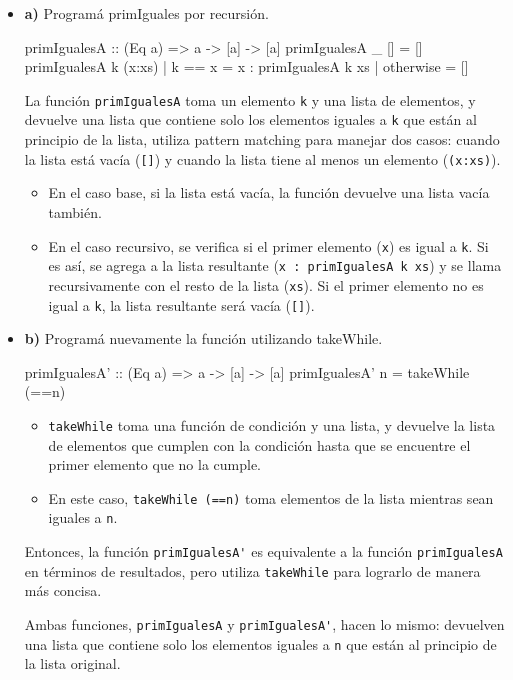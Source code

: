 \documentclass{article}
\begin{document}
\begin{itemize}
    \item 
    \textbf{a)} Programá primIguales por recursión.
    \begin{haskell}
    primIgualesA :: (Eq a) => a -> [a] -> [a]
    primIgualesA _ []  = []
    primIgualesA k (x:xs) | k == x = x : primIgualesA k xs
                          | otherwise = []
    \end{haskell}
    
    La función \verb|primIgualesA| toma un elemento \verb|k| y una lista de elementos, y devuelve una lista que contiene solo los elementos iguales a \verb|k| que están al principio de la lista, utiliza pattern matching para manejar dos casos: cuando la lista está vacía (\verb|[]|) y cuando la lista tiene al menos un elemento (\verb|(x:xs)|).
    \begin{itemize}
    \item 
    En el caso base, si la lista está vacía, la función devuelve una lista vacía también.
    \item 
    En el caso recursivo, se verifica si el primer elemento (\verb|x|) es igual a \verb|k|. Si es así, se agrega a la lista resultante (\verb|x : primIgualesA k xs|) y se llama recursivamente con el resto de la lista (\verb|xs|). Si el primer elemento no es igual a \verb|k|, la lista resultante será vacía (\verb|[]|).
    \end{itemize}


    \item 
\textbf{b)} Programá nuevamente la función utilizando takeWhile.
\begin{haskell}
primIgualesA' :: (Eq a) => a -> [a] -> [a]
primIgualesA' n = takeWhile (==n)
\end{haskell}
\begin{itemize}
\item 
\verb|takeWhile| toma una función de condición y una lista, y devuelve la lista de elementos que cumplen con la condición hasta que se encuentre el primer elemento que no la cumple.
\item 
En este caso, \verb|takeWhile (==n)| toma elementos de la lista mientras sean iguales a \verb|n|.
\end{itemize}

Entonces, la función \verb|primIgualesA'| es equivalente a la función \verb|primIgualesA| en términos de resultados, pero utiliza \verb|takeWhile| para lograrlo de manera más concisa.

Ambas funciones, \verb|primIgualesA| y \verb|primIgualesA'|, hacen lo mismo: devuelven una lista que contiene solo los elementos iguales a \verb|n| que están al principio de la lista original.

\end{itemize}
\end{document}
